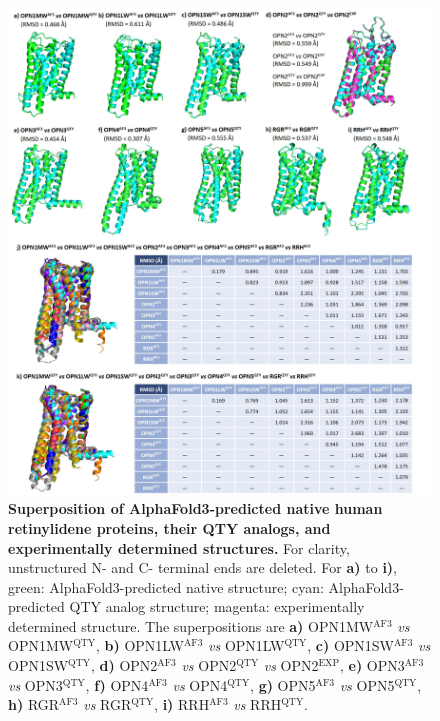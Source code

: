 \documentclass[fleqn, 10pt, lineno]{manuscript}
\begin{document}
\begin{figure}[htbp]
	\centering
	\includegraphics[width=\linewidth]{Figures/superposition-human-pairwise.jpg}
	\caption{\textbf{Superposition of AlphaFold3-predicted native human retinylidene proteins, their QTY analogs, and experimentally determined structures. } For clarity, unstructured N- and C- terminal ends are deleted. 
    For \textbf{a)} to \textbf{i)}, green: AlphaFold3-predicted native structure; cyan: AlphaFold3-predicted QTY analog structure; magenta: experimentally determined structure. The superpositions are 
    \textbf{a)} OPN1MW$^{\textrm{AF3}}$ \textit{vs} OPN1MW$^{\textrm{QTY}}$, 
    \textbf{b)} OPN1LW$^{\textrm{AF3}}$ \textit{vs} OPN1LW$^{\textrm{QTY}}$, 
    \textbf{c)} OPN1SW$^{\textrm{AF3}}$ \textit{vs} OPN1SW$^{\textrm{QTY}}$, 
    \textbf{d)} OPN2$^{\textrm{AF3}}$ \textit{vs} OPN2$^{\textrm{QTY}}$ \textit{vs} OPN2$^{\textrm{EXP}}$, 
    \textbf{e)} OPN3$^{\textrm{AF3}}$ \textit{vs} OPN3$^{\textrm{QTY}}$, 
    \textbf{f)} OPN4$^{\textrm{AF3}}$ \textit{vs} OPN4$^{\textrm{QTY}}$, 
    \textbf{g)} OPN5$^{\textrm{AF3}}$ \textit{vs} OPN5$^{\textrm{QTY}}$, 
    \textbf{h)} RGR$^{\textrm{AF3}}$ \textit{vs} RGR$^{\textrm{QTY}}$, 
    \textbf{i)} RRH$^{\textrm{AF3}}$ \textit{vs} RRH$^{\textrm{QTY}}$. 
}
\end{figure}
\end{document}
